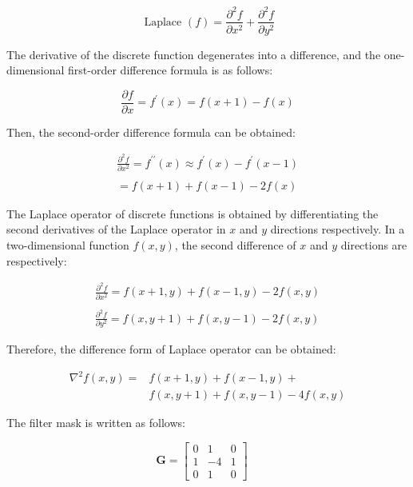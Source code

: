 \documentclass[review]{cvpr}
\begin{document}
\begin{equation}
  \text { Laplace }(f)=\frac{\partial^{2} f}{\partial x^{2}}+\frac{\partial^{2} f}{\partial y^{2}}
\end{equation}


The derivative of the discrete function degenerates into a difference, and the one-dimensional first-order difference formula is as follows:

\begin{equation}
  \frac{\partial f}{\partial x}=f^{\prime}(x)=f(x+1)-f(x)
\end{equation}


Then, the second-order difference formula can be obtained:

\begin{equation}
  \begin{array}{l}
\frac{\partial^{2} f}{\partial x^{2}}=f^{\prime \prime}(x) \approx f^{\prime}(x)-f^{\prime}(x-1) \\ \\
=f(x+1)+f(x-1)-2 f(x)
\end{array}
\end{equation}


The Laplace operator of discrete functions is obtained by differentiating the second derivatives of the Laplace operator in $x$ and $y$ directions respectively. In a two-dimensional function $f(x,y)$, the second difference of $x$ and $y$ directions are respectively:


\begin{equation}
  \begin{array}{l}
\frac{\partial^{2} f}{\partial x^{2}}=f(x+1, y)+f(x-1, y)-2 f(x, y) \\ \\
\frac{\partial^{2} f}{\partial y^{2}}=f(x, y+1)+f(x, y-1)-2 f(x, y)
\end{array}
\end{equation}


Therefore, the difference form of Laplace operator can be obtained:

\begin{equation}
\begin{split}
	  \nabla^{2}f(x, y)=&f(x+1, y)+f(x-1, y)+\\
&f(x, y+1)+f(x,y-1)-4f(x, y)
\end{split}
\end{equation}


The filter mask is written as follows:

$$\mathbf{G}=\left[\begin{array}{lll}0 & 1 & 0 \\ 1 & -4 & 1 \\ 0 & 1 & 0\end{array}\right]\quad$$
\end{document}
